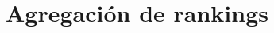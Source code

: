 \documentclass[10pt,hyperref={unicode}]{beamer}
\begin{document}
	
	
		
	
	\section{Agregación de rankings}
	
\end{document}

